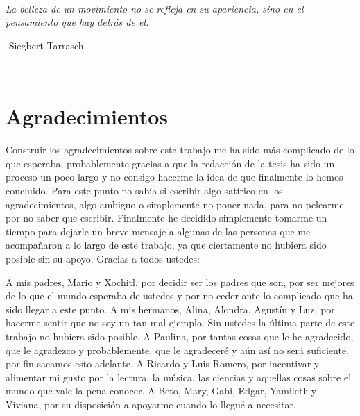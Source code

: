 \documentclass[twoside,openright,12pt,a4paper,spanish]{book}
\begin{document}
\newpage
$\ $
\thispagestyle{empty} %

\chapter*{}
 
\begin{flushright}
\singlespacing
\textit{La belleza de un movimiento no se refleja en su apariencia, sino en el pensamiento que hay detrás de el.}

-Siegbert Tarrasch

\end{flushright}

\newpage
$\ $
\thispagestyle{empty} 


\chapter*{Agradecimientos}

\noindent Construir los agradecimientos sobre este trabajo me ha sido más complicado de lo que esperaba, probablemente gracias a que la redacción de la tesis ha sido un proceso un poco largo y no consigo hacerme la idea de que finalmente lo hemos concluido. Para este punto no sabía si escribir algo satírico en los agradecimientos, algo ambiguo o simplemente no poner nada, para no pelearme por no saber que escribir. Finalmente he decidido simplemente tomarme un tiempo para dejarle un breve mensaje a algunas de las personas que me acompañaron a lo largo de este trabajo, ya que ciertamente no hubiera sido posible sin su apoyo. Gracias a todos ustedes:

A mis padres, Mario y Xochitl, por decidir ser los padres que son, por ser mejores de lo que el mundo esperaba de ustedes y por no ceder ante lo complicado que ha sido llegar a este punto. A mis hermanos, Alina, Alondra, Agustín y Luz, por hacerme sentir que no soy un tan mal ejemplo. Sin ustedes la última parte de este trabajo no hubiera sido posible. A Paulina, por tantas cosas que le he agradecido, que le agradezco y probablemente, que le agradeceré y aún así no será suficiente, por fin sacamos esto adelante. A Ricardo y Luis Romero, por incentivar y alimentar mi gusto por la lectura, la música, las ciencias y aquellas cosas sobre el mundo que vale la pena conocer. A Beto, Mary, Gabi, Edgar, Yamileth y Viviana, por su disposición a apoyarme cuando lo llegué a necesitar.
\end{document}
